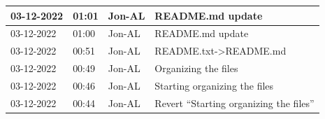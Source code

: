 \documentclass[11pt]{article}
\begin{document}
\begin{center}
\begin{longtable}{|p{2cm}|l|p{2cm}|p{10.5cm}|}
            03-12-2022                                 & 01:01                              & Jon-AL                                  & README.md update                                                                                                                                                                                                                                                                                             \\ \hline
            03-12-2022                                 & 01:00                              & Jon-AL                                  & README.md update                                                                                                                                                                                                                                                                                             \\ \hline
            03-12-2022                                 & 00:51                              & Jon-AL                                  & README.txt->README.md                                                                                                                                                                                                                                                                                        \\ \hline
            03-12-2022                                 & 00:49                              & Jon-AL                                  & Organizing the files                                                                                                                                                                                                                                                                                         \\ \hline
            03-12-2022                                 & 00:46                              & Jon-AL                                  & Starting organizing the files                                                                                                                                                                                                                                                                                \\ \hline
            03-12-2022                                 & 00:44                              & Jon-AL                                  & Revert ``Starting organizing the files''                                                                                                                                                                                                                                                                     \\ \hline

\end{longtable}
\end{center}
\end{document}
